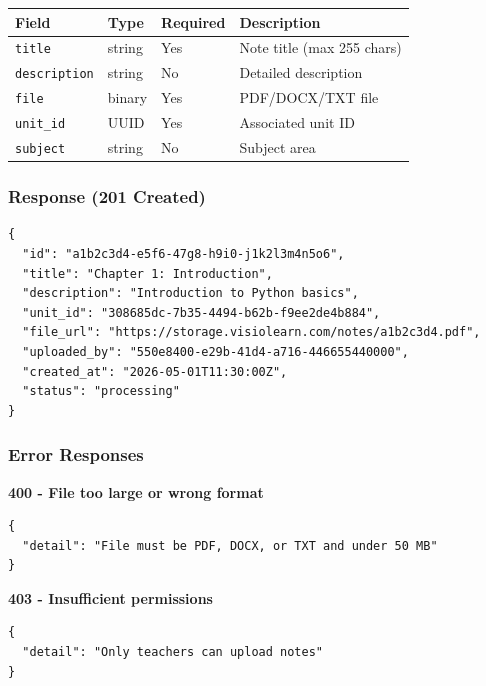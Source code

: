 \documentclass[12pt,a4paper,oneside]{article}
\begin{document}
\begin{table}[H]
\centering
\small
\begin{tabular}{|l|l|l|l|}
\hline
\textbf{Field} & \textbf{Type} & \textbf{Required} & \textbf{Description} \\
\hline
\texttt{title} & string & Yes & Note title (max 255 chars) \\
\hline
\texttt{description} & string & No & Detailed description \\
\hline
\texttt{file} & binary & Yes & PDF/DOCX/TXT file \\
\hline
\texttt{unit\_id} & UUID & Yes & Associated unit ID \\
\hline
\texttt{subject} & string & No & Subject area \\
\hline
\end{tabular}
\end{table}

\subsubsection{Response (201 Created)}

\begin{lstlisting}
{
  "id": "a1b2c3d4-e5f6-47g8-h9i0-j1k2l3m4n5o6",
  "title": "Chapter 1: Introduction",
  "description": "Introduction to Python basics",
  "unit_id": "308685dc-7b35-4494-b62b-f9ee2de4b884",
  "file_url": "https://storage.visiolearn.com/notes/a1b2c3d4.pdf",
  "uploaded_by": "550e8400-e29b-41d4-a716-446655440000",
  "created_at": "2026-05-01T11:30:00Z",
  "status": "processing"
}
\end{lstlisting}

\subsubsection{Error Responses}

\begin{tcolorbox}[colback=lightred, colframe=darkblue]
\textbf{400 - File too large or wrong format}
\begin{lstlisting}
{
  "detail": "File must be PDF, DOCX, or TXT and under 50 MB"
}
\end{lstlisting}
\end{tcolorbox}

\begin{tcolorbox}[colback=lightred, colframe=darkblue]
\textbf{403 - Insufficient permissions}
\begin{lstlisting}
{
  "detail": "Only teachers can upload notes"
}
\end{lstlisting}
\end{tcolorbox}
\end{document}
